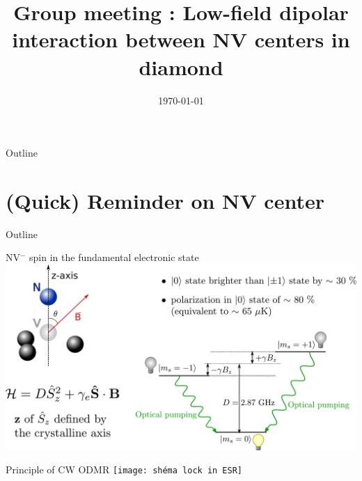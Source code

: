 \documentclass{beamer}
\title{Group meeting : Low-field dipolar interaction between NV centers in diamond}
\date\today
\begin{document}
\begin{frame}
\maketitle
\end{frame}
\begin{frame}{Outline}
\tableofcontents
\end{frame}
\section{(Quick) Reminder on NV center}
\begin{frame}{Outline}
\tableofcontents[currentsection]
\end{frame}
\begin{frame}{NV$^-$ spin in the fundamental electronic state}
\centering
\includegraphics[width=\textwidth,height=\textheight,keepaspectratio]{slide_3_niveaux}
\end{frame}
\begin{frame}{Principle of CW ODMR}
\centering
\texttt{[image: shéma lock in ESR]}
\end{frame}
\end{document}
